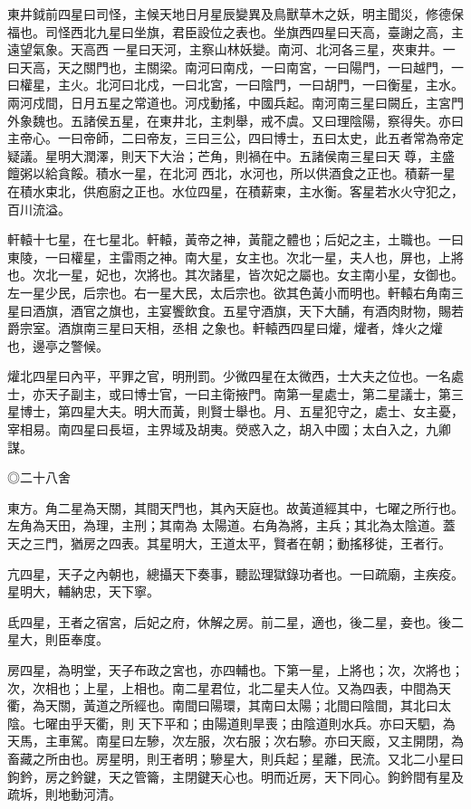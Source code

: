 \begin{pinyinscope}
{{ 東井鉞前四星曰司怪，主候天地日月星辰變異及鳥獸草木之妖，明主聞災，修德保福也。司怪西北九星曰坐旗，君臣設位之表也。坐旗西四星曰天高，臺謝之高，主遠望氣象。天高西
 一星曰天河，主察山林妖變。南河、北河各三星，夾東井。一曰天高，天之關門也，主關梁。南河曰南戍，一曰南宮，一曰陽門，一曰越門，一曰權星，主火。北河曰北戍，一曰北宮，一曰陰門，一曰胡門，一曰衡星，主水。兩河戍間，日月五星之常道也。河戍動搖，中國兵起。南河南三星曰闕丘，主宮門外象魏也。五諸侯五星，在東井北，主刺舉，戒不虞。又曰理陰陽，察得失。亦曰主帝心。一曰帝師，二曰帝友，三曰三公，四曰博士，五曰太史，此五者常為帝定疑議。星明大潤澤，則天下大治；芒角，則禍在中。五諸侯南三星曰天尊，主盛饘粥以給貪餒。積水一星，在北河
 西北，水河也，所以供酒食之正也。積薪一星在積水束北，供庖廚之正也。水位四星，在積薪柬，主水衡。客星若水火守犯之，百川流溢。



 軒轅十七星，在七星北。軒轅，黃帝之神，黃龍之體也；后妃之主，土職也。一曰東陵，一曰權星，主雷雨之神。南大星，女主也。次北一星，夫人也，屏也，上將也。次北一星，妃也，次將也。其次諸星，皆次妃之屬也。女主南小星，女御也。左一星少民，后宗也。右一星大民，太后宗也。欲其色黃小而明也。軒轅右角南三星曰酒旗，酒官之旗也，主宴饗飲食。五星守酒旗，天下大酺，有酒肉財物，賜若爵宗室。酒旗南三星曰天相，丞相
 之象也。軒轅西四星曰爟，爟者，烽火之爟也，邊亭之警候。



 爟北四星曰內平，平罪之官，明刑罰。少微四星在太微西，士大夫之位也。一名處士，亦天子副主，或曰博士官，一曰主衛掖門。南第一星處士，第二星議士，第三星博士，第四星大夫。明大而黃，則賢士舉也。月、五星犯守之，處士、女主憂，宰相易。南四星曰長垣，主界域及胡夷。熒惑入之，胡入中國；太白入之，九卿謀。



 ◎二十八舍



 東方。角二星為天關，其間天門也，其內天庭也。故黃道經其中，七曜之所行也。左角為天田，為理，主刑；其南為
 太陽道。右角為將，主兵；其北為太陰道。蓋天之三門，猶房之四表。其星明大，王道太平，賢者在朝；動搖移徙，王者行。



 亢四星，天子之內朝也，總攝天下奏事，聽訟理獄錄功者也。一曰疏廟，主疾疫。星明大，輔納忠，天下寧。



 氐四星，王者之宿宮，后妃之府，休解之房。前二星，適也，後二星，妾也。後二星大，則臣奉度。



 房四星，為明堂，天子布政之宮也，亦四輔也。下第一星，上將也；次，次將也；次，次相也；上星，上相也。南二星君位，北二星夫人位。又為四表，中間為天衢，為天關，黃道之所經也。南間曰陽環，其南曰太陽；北間曰陰間，其北曰太陰。七曜由乎天衢，則
 天下平和；由陽道則旱喪；由陰道則水兵。亦曰天駟，為天馬，主車駕。南星曰左驂，次左服，次右服；次右驂。亦曰天廄，又主開閉，為畜藏之所由也。房星明，則王者明；驂星大，則兵起；星離，民流。又北二小星曰鉤鈐，房之鈐鍵，天之管籥，主閉鍵天心也。明而近房，天下同心。鉤鈐間有星及疏坼，則地動河清。



}}
\end{pinyinscope}
